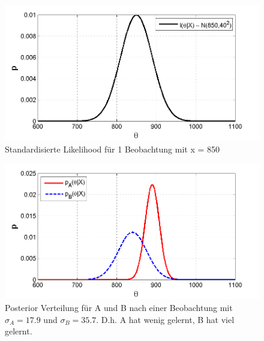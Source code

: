 \begin{figure}[!h]
	\begin{center}
		\includegraphics[width=130mm]{12_vorlesung_GUMS2/media/likelihood_1_Beobachtung.png}
		\caption{\label{fig:Beispiel_1_b} Standardisierte Likelihood
		für 1 Beobachtung mit x = 850}
	\end{center}
\end{figure}

\begin{figure}[!h]
	\begin{center}
		\includegraphics[width=130mm]{12_vorlesung_GUMS2/media/posterior_A_posterior_B.png}
		\caption{Posterior Verteilung für A und B
		nach einer Beobachtung mit $\sigma_A = 17.9$ und $\sigma_B = 35.7$. D.h. A hat wenig gelernt, B hat viel gelernt.}
     	\label{fig:Beispiel_1_c}
	\end{center}
\end{figure}

